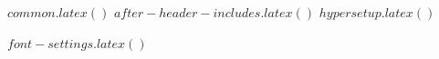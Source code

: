 
$common.latex()$
$after-header-includes.latex()$
$hypersetup.latex()$

$font-settings.latex()$

%
%
